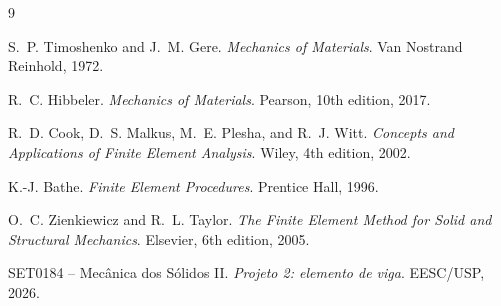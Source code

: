 \documentclass[12pt,a4paper]{article}
\begin{document}
\begin{thebibliography}{9}

S.~P. Timoshenko and J.~M. Gere.
\newblock \emph{Mechanics of Materials}.
\newblock Van Nostrand Reinhold, 1972.

R.~C. Hibbeler.
\newblock \emph{Mechanics of Materials}.
\newblock Pearson, 10th edition, 2017.

R.~D. Cook, D.~S. Malkus, M.~E. Plesha, and R.~J. Witt.
\newblock \emph{Concepts and Applications of Finite Element Analysis}.
\newblock Wiley, 4th edition, 2002.

K.-J. Bathe.
\newblock \emph{Finite Element Procedures}.
\newblock Prentice Hall, 1996.

O.~C. Zienkiewicz and R.~L. Taylor.
\newblock \emph{The Finite Element Method for Solid and Structural Mechanics}.
\newblock Elsevier, 6th edition, 2005.

SET0184 -- Mecânica dos Sólidos II.
\newblock \emph{Projeto 2: elemento de viga}.
\newblock EESC/USP, 2026.

\end{thebibliography}
\end{document}
